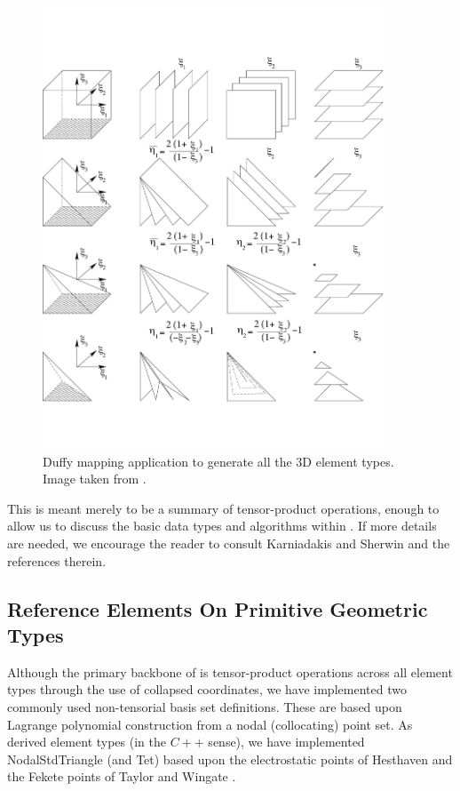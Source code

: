 \begin{figure}[htb]
\centering
\includegraphics[width=4in]{img/3dcoords.pdf}
\caption{Duffy mapping application to generate all the 3D element types.  Image taken from \cite{KaSh05}.}
\label{stdregions:3Dduffy}
\end{figure}

This is meant merely to be a summary of tensor-product operations, enough to allow us to discuss the basic
data types and algorithms within {\nek}.  If more details are needed, we encourage the reader to consult
Karniadakis and Sherwin \cite{KaSh05} and the references therein.

\subsection{Reference Elements On Primitive Geometric Types}

Although the primary backbone of {\nek} is tensor-product operations across all element types through the 
use of collapsed coordinates, we have implemented two commonly used non-tensorial basis set definitions.  
These are based upon Lagrange polynomial construction from a nodal (collocating) point set.  As derived
element types (in the $C++$ sense), we have implemented NodalStdTriangle (and Tet) based upon
the electrostatic points of Hesthaven \cite{Hesthaven98} and the Fekete points of 
Taylor and Wingate \cite{TaylorW99,TaylorWV00}.

